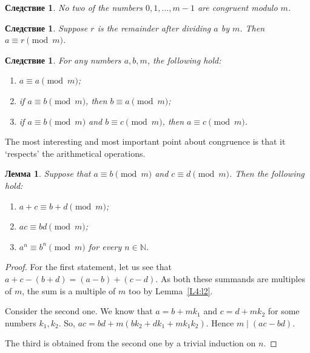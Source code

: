 \documentclass[12pt,notitlepage]{article}
\theoremstyle{plain}
\newtheorem{lemma}[thm]{Лемма}
\newtheorem{corr}[thm]{Следствие}
\theoremstyle{definition}
\theoremstyle{plain}
\newcommand{\N}{\mathbb{N}}
\newcommand{\1}{\mathbf{1}}
\newcommand{\0}{\mathbf{0}}
\newcommand{\dvd}{\mathop{\mid}}
\begin{document}
\begin{corr}\label{L4:c9}
	No two of the numbers $0, 1,\ldots, m - 1$ are congruent modulo $m$.
\end{corr}

\begin{corr}\label{L4:rem_congr}
	Suppose $r$ is the remainder after dividing $a$ by $m$. Then $a \equiv r \pmod m$.
\end{corr}

\begin{corr}
	For any numbers $a, b, m$, the following hold:
	\begin{enumerate}
		\item $a \equiv a \pmod m$;
		\item if $a \equiv b \pmod m$, then $b \equiv a \pmod m$;
		\item if $a \equiv b \pmod m$ and $b \equiv c \pmod m$, then  $a \equiv c \pmod m$.
	\end{enumerate}
\end{corr}
The most interesting and most important point about congruence is that it `respects' the arithmetical operations.
\begin{lemma}\label{L4:l7}
	Suppose that $a \equiv b \pmod m$ and $c \equiv d \pmod m$. Then the following hold:
	\begin{enumerate}
		\item $a + c \equiv b + d \pmod m$;
		\item $a c \equiv b  d \pmod m$;
		\item $a^n \equiv b^n \pmod m$ for every $n \in \N$.
	\end{enumerate}
\end{lemma}
\begin{proof}
	For the first statement, let us see that $a + c - (b + d) = (a - b) + (c - d)$. As both these summands are multiples of $m$, the sum is a multiple of $m$ too by Lemma~\ref{L4:l2}.
	
	Consider the second one. We know that $a = b + mk_1$ and $c = d + mk_2$ for some numbers $k_1, k_2$. So, $ac = bd + m(b k_2 + d k_1 + m k_1 k_2)$. Hence $m \dvd (ac - b d)$.
	
	The third is obtained from the second one by a trivial induction on $n$.
\end{proof}
\end{document}
